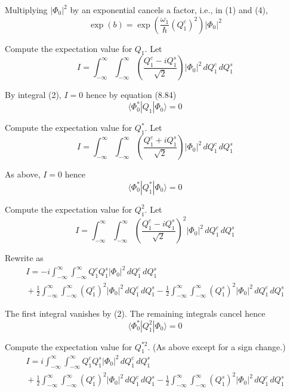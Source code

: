 \documentclass[12pt]{article}
\newcommand\U{\vert\Phi_0\vert^2}
\begin{document}
Multiplying $\U$ by an exponential cancels a factor, i.e., in (1) and (4),
\begin{equation*}
\exp(b)=\exp\left(\frac{\omega_1}{\hbar}(Q_1^c)^2\right)\U
\end{equation*}

Compute the expectation value for $Q_1$.
Let
\begin{equation*}
I=\int_{-\infty}^\infty\int_{-\infty}^\infty
\left(\frac{Q_1^c-iQ_1^s}{\sqrt2}\right)
\U\,dQ_1^c\,dQ_1^s
\end{equation*}

By integral (2), $I=0$ hence by equation (8.84)
\begin{equation*}
\langle\Phi_0^*|Q_1|\Phi_0\rangle=0
\end{equation*}

Compute the expectation value for $Q_1^*$.
Let
\begin{equation*}
I=\int_{-\infty}^\infty\int_{-\infty}^\infty
\left(\frac{Q_1^c+iQ_1^s}{\sqrt2}\right)
\U\,dQ_1^c\,dQ_1^s
\end{equation*}

As above, $I=0$ hence
\begin{equation*}
\langle\Phi_0^*|Q_1^*|\Phi_0\rangle=0
\end{equation*}

Compute the expectation value for $Q_1^2$.
Let
\begin{equation*}
I=\int_{-\infty}^\infty\int_{-\infty}^\infty
\left(\frac{Q_1^c-iQ_1^s}{\sqrt2}\right)^2
\U\,dQ_1^c\,dQ_1^s
\end{equation*}

Rewrite as
\begin{multline*}
I=-i\int_{-\infty}^\infty\int_{-\infty}^\infty
Q_1^cQ_1^s
\U\,dQ_1^c\,dQ_1^s
\\
{}+\frac{1}{2}
\int_{-\infty}^\infty\int_{-\infty}^\infty
(Q_1^c)^2
\U\,dQ_1^c\,dQ_1^s
-\frac{1}{2}
\int_{-\infty}^\infty\int_{-\infty}^\infty
(Q_1^s)^2
\U\,dQ_1^c\,dQ_1^s
\end{multline*}

The first integral vanishes by (2).
The remaining integrals cancel hence
\begin{equation*}
\langle\Phi_0^*|Q_1^2|\Phi_0\rangle=0
\end{equation*}

Compute the expectation value for $Q_1^{*2}$.
(As above except for a sign change.)
\begin{multline*}
I=i\int_{-\infty}^\infty\int_{-\infty}^\infty
Q_1^cQ_1^s
\U\,dQ_1^c\,dQ_1^s
\\
{}+\frac{1}{2}
\int_{-\infty}^\infty\int_{-\infty}^\infty
(Q_1^c)^2
\U\,dQ_1^c\,dQ_1^s
-\frac{1}{2}
\int_{-\infty}^\infty\int_{-\infty}^\infty
(Q_1^s)^2
\U\,dQ_1^c\,dQ_1^s
\end{multline*}
\end{document}
